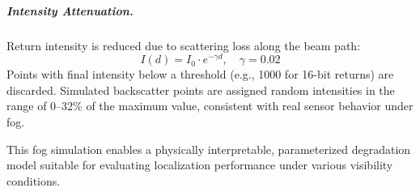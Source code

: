 \subparagraph{Intensity Attenuation.}
Return intensity is reduced due to scattering loss along the beam path:
\[
I(d) = I_0 \cdot e^{-\gamma d}, \quad \gamma = 0.02
\]
Points with final intensity below a threshold (e.g., 1000 for 16-bit returns) are discarded. Simulated backscatter points are assigned random intensities in the range of 0--32\% of the maximum value, consistent with real sensor behavior under fog.


This fog simulation enables a physically interpretable, parameterized degradation model suitable for evaluating localization performance under various visibility conditions.


